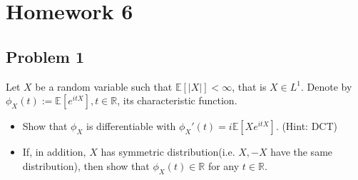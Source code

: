 \documentclass{qlnotes-export}
\begin{document}
\chapter{Homework 6}\label{homework-6}

\section{Problem 1}\label{problem-1-6}

Let \(X\) be a random variable such that \({\mathbb{E}}\left\lbrack |X| \right\rbrack < \infty\), that is \(X \in L^{1}\). Denote by \(\phi_{X}(t) := {\mathbb{E}}\left\lbrack e^{itX} \right\rbrack,t \in {\mathbb{R}}\), its characteristic function.

\begin{itemize}
\item
  Show that \(\phi_{X}\) is differentiable with \(\phi_{X}'(t) = i{\mathbb{E}}\left\lbrack {Xe^{itX}} \right\rbrack\). (Hint: DCT)
\item
  If, in addition, \(X\) has symmetric distribution(i.e. \(X, - X\) have the same distribution), then show that \(\phi_{X}(t) \in {\mathbb{R}}\) for any \(t \in {\mathbb{R}}\).
\end{itemize}
\end{document}
